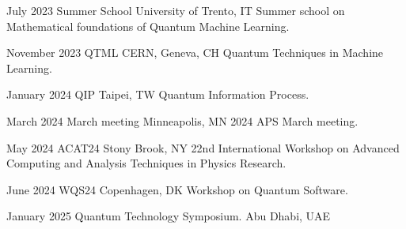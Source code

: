 \documentclass[9pt]{developercv} %
\begin{document}
\begin{entrylist}

    \entry
        {July 2023}
        {Summer School}
        {University of Trento, IT}
        {Summer school on Mathematical foundations of Quantum Machine Learning.}
        {}
         
    \entry
        {November 2023}
        {QTML}
        {CERN, Geneva, CH}
        {Quantum Techniques in Machine Learning.}
        {}

    \entry
        {January 2024}
        {QIP}
        {Taipei, TW}
        {Quantum Information Process.}
        {}

    \entry
        {March 2024}
        {March meeting}
        {Minneapolis, MN}
        {2024 APS March meeting.}
        {}

    \entry
        {May 2024}
        {ACAT24}
        {Stony Brook, NY}
        {22nd International Workshop on Advanced Computing and Analysis Techniques in Physics Research.}
        {}

    \entry
        {June 2024}
        {WQS24}
        {Copenhagen, DK}
        {Workshop on Quantum Software.}
        {}

    \entry
        {January 2025}
        {Quantum Technology Symposium.}
        {Abu Dhabi, UAE}
        {}
        {}
\end{entrylist}



\begin{refsection}[journals]
    \nocite{*}
    \printbibliography[heading=journals]
\end{refsection}

\begin{refsection}[proceedings]
    \nocite{*}
    \printbibliography[heading=proceedings]
\end{refsection}





\end{document}

